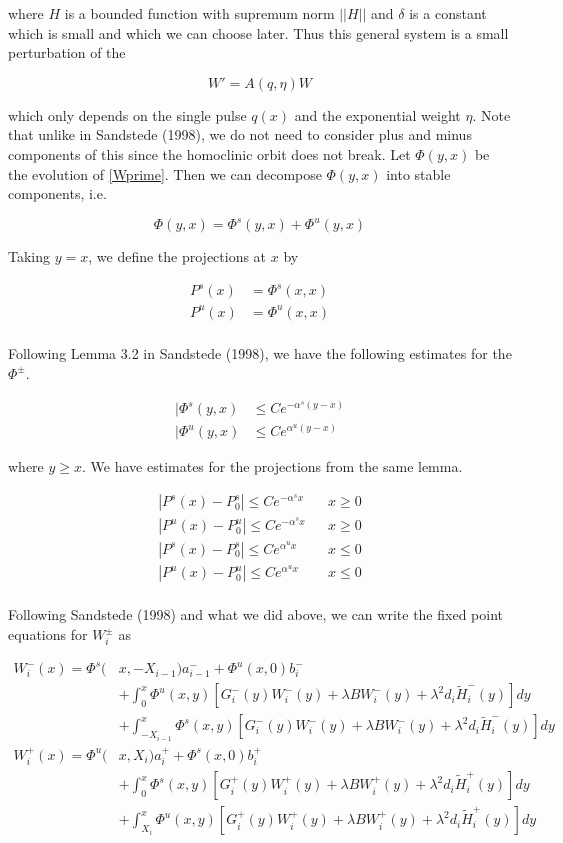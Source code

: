 \documentclass[12pt]{article}
\begin{document}
where $H$ is a bounded function with supremum norm $||H||$ and $\delta$ is a constant which is small and which we can choose later. Thus this general system is a small perturbation of the 

\begin{equation}\label{Wprime}
W' = A(q, \eta) W
\end{equation}

which only depends on the single pulse $q(x)$ and the exponential weight $\eta$. Note that unlike in Sandstede (1998), we do not need to consider plus and minus components of this since the homoclinic orbit does not break. Let $\Phi(y, x)$ be the evolution of \eqref{Wprime}. Then we can decompose $\Phi(y, x)$ into stable components, i.e. 

\[
\Phi(y, x) = \Phi^s(y, x) + \Phi^u(y, x)
\]

Taking $y = x$, we define the projections at $x$ by

\begin{align*}
P^s(x) &= \Phi^s(x,x)\\
P^u(x) &= \Phi^u(x,x)\\
\end{align*}

Following Lemma 3.2 in Sandstede (1998), we have the following estimates for the $\Phi^\pm$.

\begin{align*}
|\Phi^s(y,x) &\leq Ce^{-\alpha^s(y-x)}\\
|\Phi^u(y,x) &\leq Ce^{\alpha^u(y-x)}
\end{align*}

where $y \geq x$. We have estimates for the projections from the same lemma.

\begin{align*}
|P^s(x) - P_0^s| \leq Ce^{-\alpha^s x} && x \geq 0 \\
|P^u(x) - P_0^u| \leq Ce^{-\alpha^s x} && x \geq 0 \\
|P^s(x) - P_0^s| \leq Ce^{\alpha^u x} && x \leq 0 \\
|P^u(x) - P_0^u| \leq Ce^{\alpha^u x} && x \leq 0 \\
\end{align*}

Following Sandstede (1998) and what we did above, we can write the fixed point equations for $W_i^\pm$ as

\begin{align*}
W_i^-(x) = \Phi^s(&x, -X_{i-1})a_{i-1}^- + \Phi^u(x, 0)b_i^- \\
&+ \int_0^x \Phi^u(x, y)[G_i^-(y) W_i^-(y) + \lambda B W_i^-(y) + \lambda^2 d_i \tilde{H}_i^-(y) ] dy \\
&+ \int_{-X_{i-1}}^x \Phi^s(x, y)[G_i^-(y) W_i^-(y) + \lambda B W_i^-(y) + \lambda^2 d_i \tilde{H}_i^-(y) ] dy \\
W_i^+(x) = \Phi^u(&x, X_i)a_i^+ + \Phi^s(x, 0)b_i^+ \\
&+ \int_0^x \Phi^s(x, y)[G_i^+(y) W_i^+(y) + \lambda B W_i^+(y) + \lambda^2 d_i \tilde{H}_i^+(y)] dy \\
&+ \int_{X_i}^x \Phi^u(x, y)[G_i^+(y) W_i^+(y) + \lambda B W_i^+(y) + \lambda^2 d_i \tilde{H}_i^+(y)]dy
\end{align*}
\end{document}
